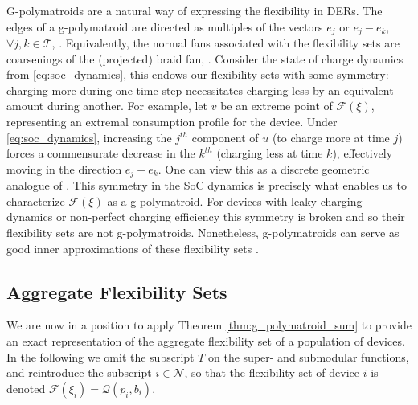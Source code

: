 \begin{remark}\label{rem:genpolyedges}
    G-polymatroids are a natural way of expressing the flexibility in DERs. The edges of a g-polymatroid are directed as multiples of the vectors $e_j$ or $e_j - e_k$, $\forall j,k \in \mathcal{T}$, \cite{Frank2014CharacterizingPolymatroids}. Equivalently, the normal fans associated with the flexibility sets are coarsenings of the (projected) braid fan, \cite[3.2]{PostnikovAlex2008FacesPermutohedra.}. Consider the state of charge dynamics from \eqref{eq:soc_dynamics}, this endows our flexibility sets with some symmetry: charging more during one time step necessitates charging less by an equivalent amount during another. For example, let $v$ be an extreme point of $\mathcal{F}(\xi)$, representing an extremal consumption profile for the device. Under \eqref{eq:soc_dynamics}, increasing the $j^{th}$ component of $u$ (to charge more at time $j$) forces a commensurate decrease in the $k^{th}$ (charging less at time $k$), effectively moving in the direction $e_j - e_k$.  
    One can view this as a discrete geometric analogue of \cite[Lemma III.1]{Evans2020AResources}. 
    This symmetry in the SoC dynamics is precisely what enables us to characterize $\mathcal{F}(\xi)$ as a g-polymatroid. For devices with leaky charging dynamics or non-perfect charging efficiency this symmetry is broken and so their flexibility sets are not g-polymatroids. Nonetheless, g-polymatroids can serve as good inner approximations of these flexibility sets \cite{Mukhi2025AggregatePolymatroids}.
    \end{remark}


\subsection{Aggregate Flexibility Sets}
    We are now in a position to apply Theorem \ref{thm:g_polymatroid_sum} to provide an exact representation of the aggregate flexibility set of a population of devices. In the following we omit the subscript $T$ on the super- and submodular functions, and reintroduce the subscript $i \in \mathcal{N}$, so that the flexibility set of device $i$ is denoted $\mathcal{F}(\xi_i) = \mathcal{Q}(p_i, b_i)$.

